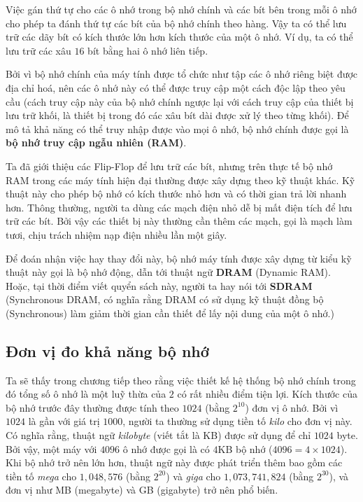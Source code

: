 Việc gán thứ tự cho các ô nhớ trong bộ nhớ chính và các bít bên trong mỗi ô nhớ cho phép
ta đánh thứ tự các bít của  bộ nhớ chính theo hàng. Vậy ta có thể lưu trữ các
dãy bít có kích thước lớn hơn kích thước  của một ô nhớ. Ví dụ, ta có thể lưu trữ các xâu $16$ bít bằng hai ô nhớ liên tiếp.


Bởi vì bộ nhớ chính của máy tính được tổ chức như tập các ô nhớ riêng biệt được địa chỉ
hoá, nên các ô nhớ này có thể được truy cập một cách độc lập theo yêu cầu (cách truy cập
này của bộ nhớ chính ngược lại với cách truy cập của thiết bị lưu trữ khối, là thiết bị
trong đó các xâu bít dài được xử lý theo từng  khối). Để mô tả khả năng có thể
truy nhập được vào mọi ô nhớ, bộ nhớ chính được gọi là \textbf{bộ nhớ truy cập ngẫu nhiên
  (RAM)}.

Ta đã giới thiệu các Flip-Flop để lưu trữ các bít, nhưng trên thực tế bộ nhớ RAM trong
các máy tính hiện đại thường được xây dựng theo kỹ thuật khác. Kỹ thuật này cho phép bộ
nhớ có kích thước nhỏ hơn và có thời gian trả lời nhanh hơn. Thông thường, người ta dùng các  mạch điện nhỏ dễ  bị mất điện tích để lưu trữ các bít. Bởi vậy các thiết
bị này thường cần thêm các mạch, gọi là mạch làm tươi, chịu trách nhiệm nạp điện nhiều
lần một giây.

Để đoán nhận việc hay thay đổi này, bộ nhớ máy tính được xây dựng từ kiểu kỹ thuật này gọi là
bộ nhớ động, dẫn tới thuật ngữ \textbf{DRAM} (Dynamic RAM). Hoặc, tại thời điểm viết quyển
sách này, người ta hay nói tới \textbf{SDRAM} (Synchronous DRAM, có nghĩa rằng DRAM có sử
dụng kỹ thuật đồng bộ (Synchronous) làm giảm thời gian cần thiết để lấy nội dung của một ô
nhớ.)

\subsection*{Đơn vị đo khả năng bộ nhớ}
Ta sẽ thấy trong chương tiếp theo rằng việc thiết kế hệ thống bộ nhớ chính trong đó tổng
số ô nhớ là một luỹ thừa của $2$ có rất nhiều điểm tiện lợi. Kích thước của bộ nhớ trước
đây thường được tính theo $1024$ (bằng $2^{10}$) đơn vị ô nhớ. Bởi vì $1024$ là gần với
giá trị $1000$, người ta thường sử dụng tiền tố \textit{kilo} cho đơn vị này. Có nghĩa
rằng, thuật ngữ \textit{kilobyte} (viết tắt là KB) được sử dụng để chỉ $1024$ byte. Bởi
vậy, một máy với $4096$ ô nhớ được gọi là có $4$KB bộ nhớ ($4096 = 4 \times 1024$). Khi bộ
nhớ trở nên lớn hơn, thuật ngữ này được phát triển thêm bao gồm các tiền tố \textit{mega}
cho $1,048,576$ (bằng $2^{20}$) và \textit{giga} cho $1,073,741,824$ (bằng $2^{30}$), và
đơn vị như MB (megabyte) và GB (gigabyte) trở nên phổ biến.

